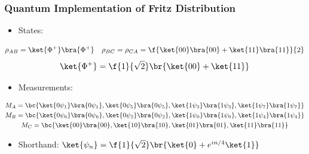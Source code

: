 \documentclass[
    hyperref={bookmarks=false},%
    xcolor={dvipsnames},
]{beamer}
\begin{document}
\begin{frame}
    \frametitle{Quantum Implementation of Fritz Distribution}
    \begin{itemize}
        \item States:
    \end{itemize}
    \begin{gather*}
        \rho_{AB} = \ket{\Phi^+}\bra{\Phi^+} \quad \rho_{BC} = \rho_{CA} = \f{\ket{00}\bra{00} + \ket{11}\bra{11}}{2}
    \end{gather*}
    \[ \ket{\Phi^+} = \f{1}{\sqrt{2}}\br{\ket{00} + \ket{11}} \]
    \begin{itemize}
        \item Measurements:
    \end{itemize}
    \begin{gather*}
        M_{A} = \bc{\ket{0\psi_{1}}\bra{0\psi_{1}}, \ket{0\psi_{5}}\bra{0\psi_{5}}, \ket{1\psi_{3}}\bra{1\psi_{3}}, \ket{1\psi_{7}}\bra{1\psi_{7}}} \\
        M_{B} = \bc{\ket{0\psi_{6}}\bra{0\psi_{6}}, \ket{0\psi_{2}}\bra{0\psi_{2}}, \ket{1\psi_{0}}\bra{1\psi_{0}}, \ket{1\psi_{4}}\bra{1\psi_{4}}} \\
        M_{C} = \bc{\ket{00}\bra{00}, \ket{10}\bra{10}, \ket{01}\bra{01}, \ket{11}\bra{11}}
    \end{gather*}
    \begin{itemize}
        \item Shorthand: $\ket{\psi_n} = \f{1}{\sqrt{2}}\br{\ket{0} + e^{in/4}\ket{1}}$
    \end{itemize}
\end{frame}
\end{document}
